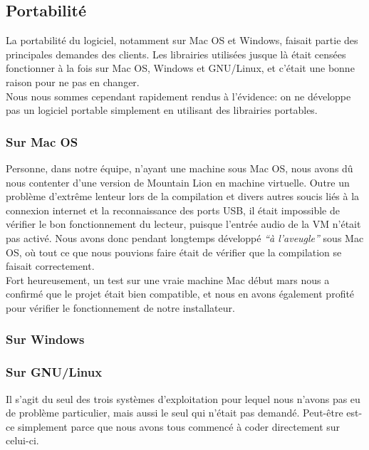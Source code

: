 \documentclass[a4paper,11pt]{article}
\begin{document}
\subsection{Portabilité}

La portabilité du logiciel, notamment sur Mac OS et Windows, faisait partie des principales demandes des clients. Les librairies utilisées jusque là était censées fonctionner à la fois sur Mac OS, Windows et GNU/Linux, et c'était une bonne raison pour ne pas en changer.\\

Nous nous sommes cependant rapidement rendus à l'évidence: on ne développe pas un logiciel portable simplement en utilisant des librairies portables.

\subsubsection*{Sur Mac OS}

Personne, dans notre équipe, n'ayant une machine sous Mac OS, nous avons dû nous contenter d'une version de Mountain Lion en machine virtuelle. Outre un problème d'extrême lenteur lors de la compilation et divers autres soucis liés à la connexion internet et la reconnaissance des ports USB, il était impossible de vérifier le bon fonctionnement du lecteur, puisque l'entrée audio de la VM n'était pas activé. Nous avons donc pendant longtemps développé \textit{``à l'aveugle''} sous Mac OS, où tout ce que nous pouvions faire était de vérifier que la compilation se faisait correctement.\\

Fort heureusement, un test sur une vraie machine Mac début mars nous a confirmé que le projet était bien compatible, et nous en avons également profité pour vérifier le fonctionnement de notre installateur.

\subsubsection*{Sur Windows}


\subsubsection*{Sur GNU/Linux}

Il s'agit du seul des trois systèmes d'exploitation pour lequel nous n'avons pas eu de problème particulier, mais aussi le seul qui n'était pas demandé. Peut-être est-ce simplement parce que nous avons tous commencé à coder directement sur celui-ci.
\end{document}
